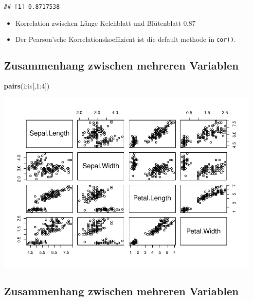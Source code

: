 \documentclass[]{article}
\newenvironment{Shaded}{\begin{snugshade}}{\end{snugshade}}
\newcommand{\KeywordTok}[1]{\textcolor[rgb]{0.13,0.29,0.53}{\textbf{{#1}}}}
\newcommand{\DataTypeTok}[1]{\textcolor[rgb]{0.13,0.29,0.53}{{#1}}}
\newcommand{\DecValTok}[1]{\textcolor[rgb]{0.00,0.00,0.81}{{#1}}}
\newcommand{\StringTok}[1]{\textcolor[rgb]{0.31,0.60,0.02}{{#1}}}
\newcommand{\NormalTok}[1]{{#1}}
\providecommand{\tightlist}{%
  \setlength{\itemsep}{0pt}\setlength{\parskip}{0pt}}
\begin{document}
\begin{verbatim}
## [1] 0.8717538
\end{verbatim}

\begin{itemize}
\tightlist
\item
  Korrelation zwischen Länge Kelchblatt und Blütenblatt 0,87
\item
  Der Pearson'sche Korrelationskoeffizient ist die default methode in
  \texttt{cor()}.
\end{itemize}

\subsection{Zusammenhang zwischen mehreren
Variablen}\label{zusammenhang-zwischen-mehreren-variablen}

\begin{Shaded}
\begin{Highlighting}[]
\KeywordTok{pairs}\NormalTok{(iris[,}\DecValTok{1}\NormalTok{:}\DecValTok{4}\NormalTok{])}
\end{Highlighting}
\end{Shaded}

\includegraphics{Intro_Datenanalyse1_files/figure-latex/unnamed-chunk-162-1.pdf}

\subsection{Zusammenhang zwischen mehreren
Variablen}\label{zusammenhang-zwischen-mehreren-variablen-1}

\begin{Shaded}
\end{Shaded}
\end{document}

